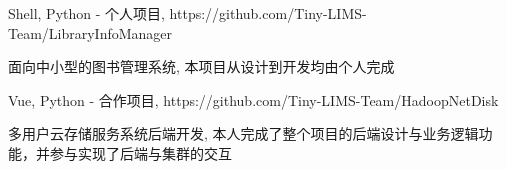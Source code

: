 \documentclass{resume}
\begin{document}
Shell, Python - 个人项目, https://github.com/Tiny-LIMS-Team/LibraryInfoManager \newline
\begin{onehalfspacing}
面向中小型的图书管理系统, 本项目从设计到开发均由个人完成
\end{onehalfspacing}

Vue, Python - 合作项目, https://github.com/Tiny-LIMS-Team/HadoopNetDisk \newline
\begin{onehalfspacing}
多用户云存储服务系统后端开发, 本人完成了整个项目的后端设计与业务逻辑功能，并参与实现了后端与集群的交互
\end{onehalfspacing}
\end{document}
